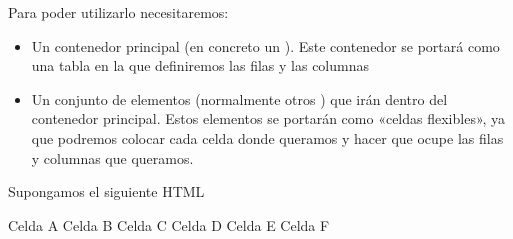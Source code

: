 \documentclass[letterpaper,10pt,spanish]{sphinxmanual}
\begin{document}
Para poder utilizarlo necesitaremos:
\begin{itemize}
\item {} 
Un contenedor principal (en concreto un ). Este contenedor se portará como una tabla en la que definiremos las filas y las columnas

\item {} 
Un conjunto de elementos (normalmente otros ) que irán dentro del contenedor principal. Estos elementos se portarán como «celdas flexibles», ya que podremos colocar cada celda donde queramos y hacer que ocupe las filas y columnas que queramos.

\end{itemize}

Supongamos el siguiente HTML

\begin{sphinxVerbatim}[commandchars=\\\{\}]
 
      Celda A
      Celda B
      Celda C
      Celda D
      Celda E
      Celda F
\end{sphinxVerbatim}
\end{document}
